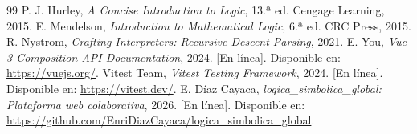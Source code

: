 \documentclass[11pt,a4paper]{article}
\begin{document}
\begin{thebibliography}{99}
 P. J. Hurley, \textit{A Concise Introduction to Logic}, 13.ª ed. Cengage Learning, 2015.
 E. Mendelson, \textit{Introduction to Mathematical Logic}, 6.ª ed. CRC Press, 2015.
 R. Nystrom, \textit{Crafting Interpreters: Recursive Descent Parsing}, 2021.
 E. You, \textit{Vue 3 Composition API Documentation}, 2024. [En línea]. Disponible en: \url{https://vuejs.org/}.
 Vitest Team, \textit{Vitest Testing Framework}, 2024. [En línea]. Disponible en: \url{https://vitest.dev/}.
 E. Díaz Cayaca, \textit{logica\_simbolica\_global: Plataforma web colaborativa}, 2026. [En línea]. Disponible en: \url{https://github.com/EnriDiazCayaca/logica_simbolica_global}.
\end{thebibliography}
\end{document}
